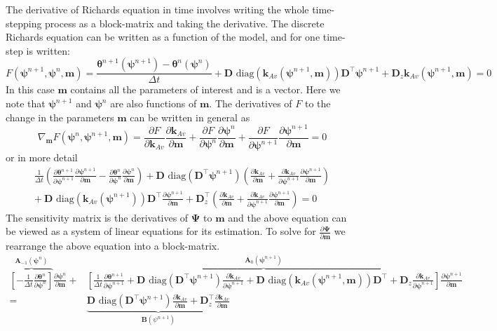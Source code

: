 \documentclass[11pt]{article}
\newcommand{\GRAD}{\nabla}
\newcommand{\deriv}[2]{\frac{\partial #1}{\partial #2}}
\newcommand{\diag}[1]{\text{ diag}\left(#1\right)}
\newcommand{\nn}{^{n+1}}
\newcommand{\n}{^{n}}
\newcommand{\bfA}{\mathbf{A}}
\newcommand{\bfB}{\mathbf{B}}
\newcommand{\bfD}{\mathbf{D}}
\newcommand{\bfk}{\mathbf{k}}
\newcommand{\bfm}{\mathbf{m}}
\newcommand{\bftheta}{\boldsymbol{\theta}}
\newcommand{\bfpsi}{\boldsymbol{\psi}}
\newcommand{\bfPsi}{\boldsymbol{\Psi}}
\newcommand{\FF}{F}
\begin{document}
The derivative of Richards equation in time involves writing the whole time-stepping
process as a block-matrix and taking the derivative. The discrete
Richards equation can be written as a function of the model, and for one
time-step is written:
\begin{equation}
\label{eq:Richards}
\FF(\bfpsi\nn,\bfpsi\n,\bfm) =
\frac{\bftheta\nn(\bfpsi\nn) - \bftheta^n(\bfpsi\n)}{\Delta t}
+
\bfD \diag{\bfk_{Av}(\bfpsi\nn,\bfm)}\bfD^{\top} \bfpsi\nn
+
\bfD_{z} \bfk_{Av}(\bfpsi\nn,\bfm)
= 0
\end{equation}
In this case $\bfm$ contains all the parameters of interest and is a vector. Here
we note that $\bfpsi\nn$ and $\bfpsi\n$ are also functions of $\bfm$. The derivatives
of $\FF$ to the change in the parameters $\bfm$ can be written in general as
\begin{equation}
\label{eq:sensitivity}
    \GRAD_\bfm  F(\bfpsi^n,\bfpsi\nn,\bfm)
    =
    \deriv{F}{\bfk_{Av}}\deriv{\bfk_{Av}}{\bfm}
    + \deriv{F}{\bfpsi^n}\deriv{\bfpsi^n}{\bfm}
    + \deriv{F}{\bfpsi\nn}\deriv{\bfpsi\nn}{\bfm}
    =0
\end{equation}
or in more detail
\begin{align}
\frac{1}{\Delta t}
\left(
    \deriv{\bftheta\nn}{\bfpsi\nn}\deriv{\bfpsi\nn}{\bfm}
    -
    \deriv{\bftheta\n}{\bfpsi\n}\deriv{\bfpsi\n}{\bfm}
\right)
+
\bfD \diag{\bfD^{\top} \bfpsi\nn}
    \left(
        \deriv{\bfk_{Av}}{\bfm} + \deriv{\bfk_{Av}}{\bfpsi\nn}\deriv{\bfpsi\nn}{\bfm}
    \right)
\nonumber\\
+\
\bfD \diag{\bfk_{Av}(\bfpsi\nn)} \bfD^{\top} \deriv{\bfpsi\nn}{\bfm}
+
\bfD_{z}^{\top}
\left(
    \deriv{\bfk_{Av}}{\bfm} + \deriv{\bfk_{Av}}{\bfpsi\nn}\deriv{\bfpsi\nn}{\bfm}
\right)
=0
\end{align}
The sensitivity matrix is the derivatives of $\bfPsi$ to $\bfm$ and the above equation
can be viewed as a system of linear equations for its estimation.
To solve for $\deriv{\bfPsi}{\bfm}$ we rearrange the
above equation into a block-matrix.
\begin{align}
\label{eq:rearrangedDeriv}
\overbrace{
\left[
    -\frac{1}{\Delta t} \deriv{\bftheta\n}{\bfpsi\n}
\right]
}^{\bfA_{-1}(\bfpsi\n)}
\deriv{\bfpsi\n}{\bfm}
+
&
\overbrace{
    \left[
        \frac{1}{\Delta t} \deriv{\bftheta\nn}{\bfpsi\nn}
        +\bfD \diag{\bfD^{\top} \bfpsi\nn}\deriv{\bfk_{Av}}{\bfpsi\nn}
        +\bfD \diag{\bfk_{Av}(\bfpsi\nn,\bfm)} \bfD^{\top}
        + \bfD_{z}\deriv{\bfk_{Av}}{\bfpsi\nn}
    \right]
}^{\bfA_0(\bfpsi\nn)}
\deriv{\bfpsi\nn}{\bfm}
\nonumber\\
=
&
\underbrace{
\bfD \diag{\bfD^{\top} \bfpsi\nn}\deriv{\bfk_{Av}}{\bfm}
+\bfD^{\top}_{z}\deriv{\bfk_{Av}}{\bfm}
}_{\bfB(\psi\nn)}
\end{align}
\end{document}
